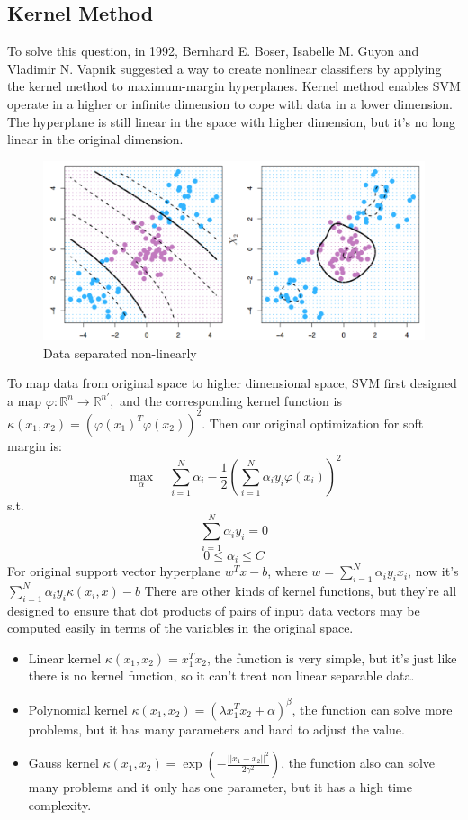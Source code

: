 \documentclass{article}
\begin{document}
\subsection{Kernel Method} To solve this question, in 1992, Bernhard E. Boser, Isabelle M. Guyon and Vladimir N. Vapnik suggested a way to create nonlinear classifiers by applying the kernel method to maximum-margin hyperplanes\cite{3}. Kernel method enables SVM operate in a higher or infinite dimension to cope with data in a lower dimension. The hyperplane is still linear in the space with higher dimension, but it's no long linear in the original dimension. 
\begin{figure}[H]
    \centering
    \includegraphics[scale=0.25]{P4.jpg}
    \caption{Data separated non-linearly}
    \label{nlsd}
\end{figure}
To map data from original space to higher dimensional space, SVM first designed a map $\varphi:\mathbb{R}^n\rightarrow\mathbb{R}^{n'},$ and the corresponding kernel function is $\kappa(x_1,x_2)=(\varphi(x_1)^T\varphi(x_2))^2$. Then our original optimization for soft margin is:
$$\max_\alpha\quad\sum_{i=1}^N\alpha_i-\frac{1}{2}(\sum_{i=1}^N\alpha_iy_i\varphi(x_i))^2$$
s.t.
    $$\sum_{i=1}^N\alpha_iy_i=0$$
    $$0\leq\alpha_i\leq C$$
For original support vector hyperplane $w^Tx-b$, where $w=\sum_{i=1}^N\alpha_iy_ix_i$, now it's $\sum_{i=1}^N\alpha_iy_i\kappa(x_i,x)-b$
There are other kinds of kernel functions, but they're all designed to ensure that dot products of pairs of input data vectors may be computed easily in terms of the variables in the original space\cite{4}.
\begin{itemize}
    \item Linear kernel $\kappa(x_1,x_2)=x_1^Tx_2$, the function is very simple, but it's just like there is no kernel function, so it can't treat non linear separable data.
    \item Polynomial kernel $\kappa(x_1,x_2)=(\lambda x_1^Tx_2+\alpha)^\beta$, the function can solve more problems, but it has many parameters and hard to adjust the value.
    \item Gauss kernel $\kappa(x_1,x_2)=\exp(-\frac{||x_1-x_2||^2}{2\gamma^2})$, the function also can solve many problems and it only has one parameter, but it has a high time complexity.
\end{itemize}
\end{document}
